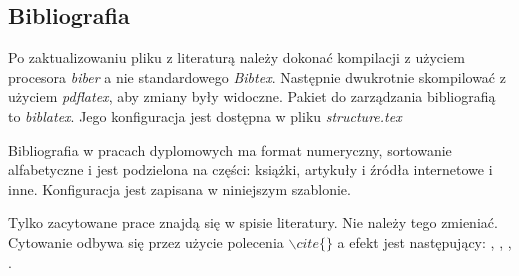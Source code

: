 \subsection{Bibliografia}

Po zaktualizowaniu pliku z literaturą należy dokonać kompilacji z użyciem procesora {\em biber} a nie standardowego  {\em Bibtex}. Następnie dwukrotnie skompilować z użyciem {\em pdflatex}, aby zmiany były widoczne. Pakiet do zarządzania bibliografią to {\em biblatex}. Jego konfiguracja jest dostępna w pliku {\em structure.tex}

Bibliografia w pracach dyplomowych ma format numeryczny, sortowanie alfabetyczne i jest podzielona na  części: książki, artykuły i źródła internetowe i inne. Konfiguracja jest zapisana w niniejszym szablonie.

Tylko zacytowane prace znajdą się w spisie literatury. Nie należy tego zmieniać. Cytowanie odbywa się przez użycie polecenia $\backslash cite\{\}$ a efekt jest następujący: \cite{book_key}, \cite{article_key}, \cite{lam1994}, \cite{knuthwebsite}.





